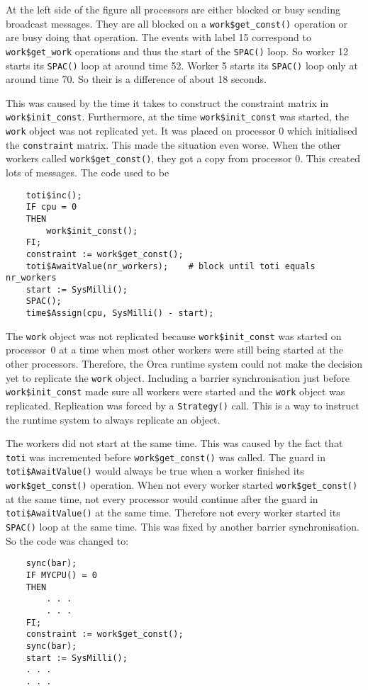 \documentclass[a4paper,11pt]{article}
\begin{document}
At the left side of the figure all processors are either blocked or
busy sending broadcast messages.
They are all blocked on a {\tt work\$get\_const()} operation
or are busy doing that operation.
The events with label 15 correspond to {\tt work\$get\_work} operations and
thus the start of the {\tt SPAC()} loop. So worker 12 starts its
{\tt SPAC()} loop at around time 52. Worker 5 starts its {\tt SPAC()} loop
only at around time 70. So their is a difference of about 18 seconds.

This was caused by the time it takes to
construct the
constraint matrix in {\tt work\$init\_const}.
Furthermore, at the time {\tt work\$init\_const}
was started, the {\tt work} object was not replicated yet. It was placed
on processor 0 which initialised the {\tt constraint} matrix. This made
the situation even worse. When the other workers called 
{\tt work\$get\_const()}, they got a copy from processor 0. This created
lots of messages.
The code used to be
\begin{verbatim}
    toti$inc();
    IF cpu = 0
    THEN
        work$init_const();
    FI;
    constraint := work$get_const();
    toti$AwaitValue(nr_workers);    # block until toti equals nr_workers
    start := SysMilli();
    SPAC();
    time$Assign(cpu, SysMilli() - start);
\end{verbatim}

The {\tt work} object was not replicated because
{\tt work\$init\_const} was started on
processor~0 at a time when most other workers were still being
started at the other processors. Therefore, the Orca runtime system
could not make
the decision yet to replicate the {\tt work} object. Including a
barrier synchronisation just before {\tt work\$init\_const} made sure
all workers were started and the {\tt work} object was replicated.
Replication was forced by a {\tt Strategy()} call. This is a way
to instruct the runtime system to always replicate an object.

The workers did not start at the same time. This was caused by the fact that
{\tt toti} was incremented before {\tt work\$get\_const()} 
was called. The guard in {\tt toti\$AwaitValue()} would always
be true
when a worker finished its {\tt work\$get\_const()} operation.
When not every worker started 
{\tt work\$get\_const()} at the same time, not every processor would
continue after the guard in {\tt toti\$AwaitValue()} at the
same time. Therefore not every worker started its {\tt SPAC()} loop at the
same time. This was fixed by another barrier synchronisation.
So the code was changed to:
\begin{verbatim}
    sync(bar);
    IF MYCPU() = 0
    THEN
        . . .
        . . .
    FI;
    constraint := work$get_const();
    sync(bar);
    start := SysMilli();
    . . .
    . . .
\end{verbatim}
\end{document}

